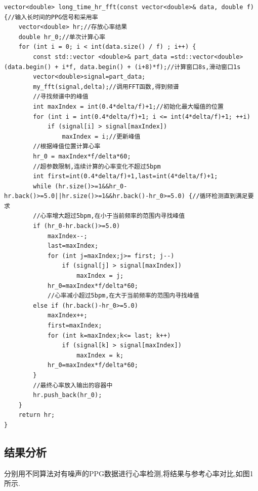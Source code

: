 \documentclass[12pt, a4paper, oneside]{ctexart}
\begin{document}
    \begin{lstlisting}[caption={对PPG信号的FFT处理函数}]
vector<double> long_time_hr_fft(const vector<double>& data, double f) {//输入长时间的PPG信号和采用率
    vector<double> hr;//存放心率结果
    double hr_0;//单次计算心率
    for (int i = 0; i < int(data.size() / f) ; i++) {
        const std::vector <double>& part_data =std::vector<double>(data.begin() + i*f, data.begin() + (i+8)*f);//计算窗口8s,滑动窗口1s
        vector<double>signal=part_data;
        my_fft(signal,delta);//调用FFT函数,得到频谱
        //寻找频谱中的峰值
        int maxIndex = int(0.4*delta/f)+1;//初始化最大幅值的位置
        for (int i = int(0.4*delta/f)+1; i <= int(4*delta/f)+1; ++i) 
            if (signal[i] > signal[maxIndex]) 
                maxIndex = i;//更新峰值
        //根据峰值位置计算心率
        hr_0 = maxIndex*f/delta*60;
        //超参数限制,连续计算的心率变化不超过5bpm
        int first=int(0.4*delta/f)+1,last=int(4*delta/f)+1;
        while (hr.size()>=1&&hr_0-hr.back()>=5.0||hr.size()>=1&&hr.back()-hr_0>=5.0) {//循环检测直到满足要求
        //心率增大超过5bpm,在小于当前频率的范围内寻找峰值
        if (hr_0-hr.back()>=5.0) 
            maxIndex--;
            last=maxIndex;
            for (int j=maxIndex;j>= first; j--) 
                if (signal[j] > signal[maxIndex]) 
                    maxIndex = j;
            hr_0=maxIndex*f/delta*60;
            //心率减小超过5bpm,在大于当前频率的范围内寻找峰值
        else if (hr.back()-hr_0>=5.0) 
            maxIndex++;
            first=maxIndex;
            for (int k=maxIndex;k<= last; k++) 
                if (signal[k] > signal[maxIndex]) 
                    maxIndex = k;
            hr_0=maxIndex*f/delta*60;
        }
        //最终心率放入输出的容器中
        hr.push_back(hr_0);
    }
    return hr;
}
        \end{lstlisting} 


    \newpage
    \subsection{结果分析}
    分别用不同算法对有噪声的PPG数据进行心率检测,将结果与参考心率对比,如图1所示.
\end{document}
